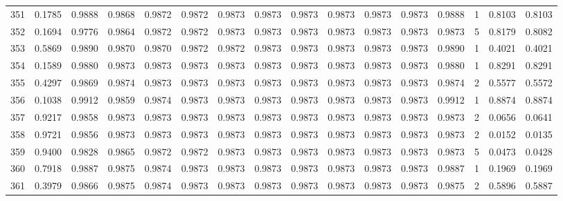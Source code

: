 \begin{tabular}{lrrrrrrrrrrrrrrr}
351 &      0.1785 &  0.9888 &  0.9868 &  0.9872 &  0.9872 &  0.9873 &  0.9873 &  0.9873 &  0.9873 &  0.9873 &   0.9873 &     0.9888 &      1 &                    0.8103 &                     0.8103 \\
352 &      0.1694 &  0.9776 &  0.9864 &  0.9872 &  0.9872 &  0.9873 &  0.9873 &  0.9873 &  0.9873 &  0.9873 &   0.9873 &     0.9873 &      5 &                    0.8179 &                     0.8082 \\
353 &      0.5869 &  0.9890 &  0.9870 &  0.9870 &  0.9872 &  0.9872 &  0.9873 &  0.9873 &  0.9873 &  0.9873 &   0.9873 &     0.9890 &      1 &                    0.4021 &                     0.4021 \\
354 &      0.1589 &  0.9880 &  0.9873 &  0.9873 &  0.9873 &  0.9873 &  0.9873 &  0.9873 &  0.9873 &  0.9873 &   0.9873 &     0.9880 &      1 &                    0.8291 &                     0.8291 \\
355 &      0.4297 &  0.9869 &  0.9874 &  0.9873 &  0.9873 &  0.9873 &  0.9873 &  0.9873 &  0.9873 &  0.9873 &   0.9873 &     0.9874 &      2 &                    0.5577 &                     0.5572 \\
356 &      0.1038 &  0.9912 &  0.9859 &  0.9874 &  0.9873 &  0.9873 &  0.9873 &  0.9873 &  0.9873 &  0.9873 &   0.9873 &     0.9912 &      1 &                    0.8874 &                     0.8874 \\
357 &      0.9217 &  0.9858 &  0.9873 &  0.9873 &  0.9873 &  0.9873 &  0.9873 &  0.9873 &  0.9873 &  0.9873 &   0.9873 &     0.9873 &      2 &                    0.0656 &                     0.0641 \\
358 &      0.9721 &  0.9856 &  0.9873 &  0.9873 &  0.9873 &  0.9873 &  0.9873 &  0.9873 &  0.9873 &  0.9873 &   0.9873 &     0.9873 &      2 &                    0.0152 &                     0.0135 \\
359 &      0.9400 &  0.9828 &  0.9865 &  0.9872 &  0.9872 &  0.9873 &  0.9873 &  0.9873 &  0.9873 &  0.9873 &   0.9873 &     0.9873 &      5 &                    0.0473 &                     0.0428 \\
360 &      0.7918 &  0.9887 &  0.9875 &  0.9874 &  0.9873 &  0.9873 &  0.9873 &  0.9873 &  0.9873 &  0.9873 &   0.9873 &     0.9887 &      1 &                    0.1969 &                     0.1969 \\
361 &      0.3979 &  0.9866 &  0.9875 &  0.9874 &  0.9873 &  0.9873 &  0.9873 &  0.9873 &  0.9873 &  0.9873 &   0.9873 &     0.9875 &      2 &                    0.5896 &                     0.5887 \\

\end{tabular}
